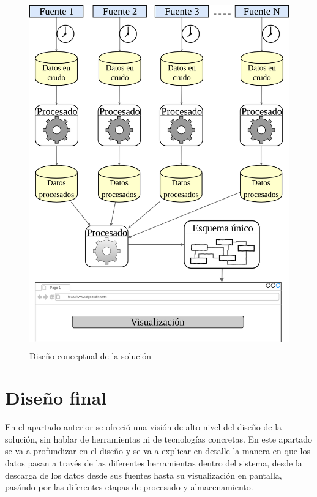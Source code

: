 \begin{figure}[H]
    \centering
    \includegraphics[width=1\textwidth,height=15cm,keepaspectratio]{Imagenes/disenyoconceptual}
    \caption{Diseño conceptual de la solución}
    \label{fig:disenyoconceptual}
\end{figure}




\section{Diseño final} \label{disenyo.final}



En el apartado anterior se ofreció una visión de alto nivel del diseño de la solución, sin hablar de herramientas ni de tecnologías concretas. En este apartado se va a profundizar en el diseño y se va a explicar en detalle la manera en que los datos pasan a través de las diferentes herramientas dentro del sistema, desde la descarga de los datos desde sus fuentes hasta su visualización en pantalla, pasándo por las diferentes etapas de procesado y almacenamiento. 
\par


